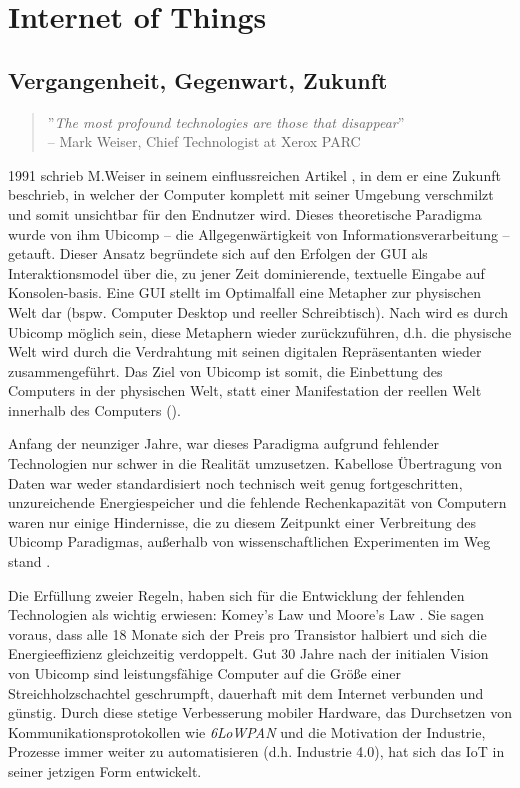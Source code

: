 \section{Internet of Things}
\subsection{Vergangenheit, Gegenwart, Zukunft}
\begin{quote}
''\textit{The most profound technologies are those that disappear}'' \\-- Mark Weiser, Chief Technologist at Xerox PARC
\end{quote}

1991 schrieb M.Weiser in seinem einflussreichen Artikel \cite{weiser1991computer}, in dem er eine Zukunft beschrieb, in welcher der Computer komplett mit seiner Umgebung verschmilzt und somit unsichtbar für den Endnutzer wird. Dieses theoretische Paradigma wurde von ihm \ac{Ubicomp} -- die Allgegenwärtigkeit von Informationsverarbeitung -- getauft. Dieser Ansatz begründete sich auf den Erfolgen der \ac{GUI} als Interaktionsmodel über die, zu jener Zeit dominierende, textuelle Eingabe auf Konsolen-basis. Eine \ac{GUI} stellt im Optimalfall eine Metapher zur physischen Welt dar (bspw. Computer Desktop und reeller Schreibtisch). Nach \cite{weiser1991computer} wird es durch \ac{Ubicomp} möglich sein, diese Metaphern wieder zurückzuführen, d.h. die physische Welt wird durch die Verdrahtung mit seinen digitalen Repräsentanten wieder zusammengeführt. Das Ziel von \ac{Ubicomp} ist somit, die Einbettung des Computers in der physischen Welt, statt einer Manifestation der reellen Welt innerhalb des Computers (\cite{lyytinen2002ubiquitous}). 

Anfang der neunziger Jahre, war dieses Paradigma aufgrund fehlender Technologien nur schwer in die Realität umzusetzen. Kabellose Übertragung von Daten war weder standardisiert noch technisch weit genug fortgeschritten, unzureichende Energiespeicher und die fehlende Rechenkapazität von Computern waren nur einige Hindernisse, die zu diesem Zeitpunkt einer Verbreitung des \ac{Ubicomp} Paradigmas, außerhalb von wissenschaftlichen Experimenten im Weg stand \cite{lyytinen2002ubiquitous}.

Die Erfüllung zweier Regeln, haben sich für die Entwicklung der fehlenden Technologien als wichtig erwiesen: Komey's Law \cite{koomey2010law} und Moore's Law \cite{schaller1997moore}. Sie sagen voraus, dass alle 18 Monate sich der Preis pro Transistor halbiert und sich die Energieeffizienz gleichzeitig verdoppelt. Gut 30 Jahre nach der initialen Vision von \ac{Ubicomp} sind leistungsfähige Computer auf die Größe einer Streichholzschachtel geschrumpft, dauerhaft mit dem Internet verbunden und günstig. Durch diese stetige Verbesserung mobiler Hardware, das Durchsetzen von Kommunikationsprotokollen wie \textit{6LoWPAN} und die Motivation der Industrie, Prozesse immer weiter zu automatisieren (d.h. Industrie 4.0), hat sich das \acf{IoT} in seiner jetzigen Form entwickelt.


